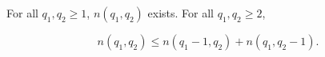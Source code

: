 For all $q_1, q_2 \geq 1$, $n(q_1, q_2)$ exists. For all $q_1, q_2 \geq 2$,

$$n(q_1, q_2) \leq n(q_1 - 1, q_2) + n(q_1, q_2 - 1).$$
